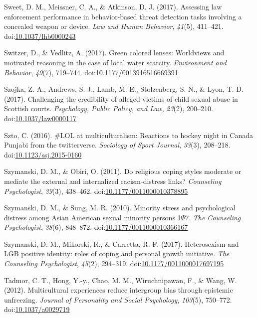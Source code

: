 \documentclass[english,man]{apa6}
\theoremstyle{definition}
\theoremstyle{definition}
\theoremstyle{definition}
\theoremstyle{remark}
\begin{document}
\hypertarget{ref-Sweet2017}{}
Sweet, D. M., Meissner, C. A., \& Atkinson, D. J. (2017). Assessing law
enforcement performance in behavior-based threat detection tasks
involving a concealed weapon or device. \emph{Law and Human Behavior},
\emph{41}(5), 411--421.
doi:\href{https://doi.org/10.1037/lhb0000243}{10.1037/lhb0000243}

\hypertarget{ref-Switzer2017}{}
Switzer, D., \& Vedlitz, A. (2017). Green colored lenses: Worldviews and
motivated reasoning in the case of local water scarcity.
\emph{Environment and Behavior}, \emph{49}(7), 719--744.
doi:\href{https://doi.org/10.1177/0013916516669391}{10.1177/0013916516669391}

\hypertarget{ref-Szojka2017}{}
Szojka, Z. A., Andrews, S. J., Lamb, M. E., Stolzenberg, S. N., \& Lyon,
T. D. (2017). Challenging the credibility of alleged victims of child
sexual abuse in Scottish courts. \emph{Psychology, Public Policy, and
Law}, \emph{23}(2), 200--210.
doi:\href{https://doi.org/10.1037/law0000117}{10.1037/law0000117}

\hypertarget{ref-Szto2016}{}
Szto, C. (2016). \#LOL at multiculturalism: Reactions to hockey night in
Canada Punjabi from the twitterverse. \emph{Sociology of Sport Journal},
\emph{33}(3), 208--218.
doi:\href{https://doi.org/10.1123/ssj.2015-0160}{10.1123/ssj.2015-0160}

\hypertarget{ref-Szymanski2011}{}
Szymanski, D. M., \& Obiri, O. (2011). Do religious coping styles
moderate or mediate the external and internalized racism-distress links?
\emph{Counseling Psychologist}, \emph{39}(3), 438--462.
doi:\href{https://doi.org/10.1177/0011000010378895}{10.1177/0011000010378895}

\hypertarget{ref-Szymanski2010}{}
Szymanski, D. M., \& Sung, M. R. (2010). Minority stress and
psychological distress among Asian American sexual minority persons
1\(\Psi\)7. \emph{The Counseling Psychologist}, \emph{38}(6), 848--872.
doi:\href{https://doi.org/10.1177/0011000010366167}{10.1177/0011000010366167}

\hypertarget{ref-Szymanski2017}{}
Szymanski, D. M., Mikorski, R., \& Carretta, R. F. (2017). Heterosexism
and LGB positive identity: roles of coping and personal growth
initiative. \emph{The Counseling Psychologist}, \emph{45}(2), 294--319.
doi:\href{https://doi.org/10.1177/0011000017697195}{10.1177/0011000017697195}

\hypertarget{ref-Tadmor2012}{}
Tadmor, C. T., Hong, Y.-y., Chao, M. M., Wiruchnipawan, F., \& Wang, W.
(2012). Multicultural experiences reduce intergroup bias through
epistemic unfreezing. \emph{Journal of Personality and Social
Psychology}, \emph{103}(5), 750--772.
doi:\href{https://doi.org/10.1037/a0029719}{10.1037/a0029719}
\end{document}
